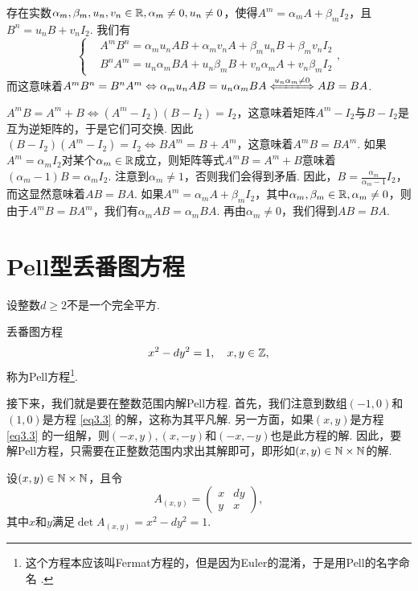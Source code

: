 \begin{solution}
  存在实数$\alpha_m,\beta_m,u_n,v_n\in\mathbb R,\alpha_m\ne0,u_n\ne0$，使得$A^m=\alpha_mA+\beta_mI_2$，且$B^n=u_nB+v_nI_2$. 我们有
  \[
    \left\{
      \begin{aligned}
        & A^mB^n = \alpha_mu_nAB + \alpha_mv_nA + \beta_mu_n B + \beta_mv_nI_2 \\
        & B^nA^m = u_n\alpha_mBA + u_n\beta_mB + v_n\alpha_mA + v_n\beta_mI_2
      \end{aligned}
    \right.,
  \]
  而这意味着$A^mB^n=B^nA^m\Leftrightarrow \alpha_mu_nAB=u_n\alpha_mBA\xLongleftrightarrow{u_n
  \alpha_m\ne0}AB=BA$.
\end{solution}

\begin{solution}
  $A^mB=A^m+B\Leftrightarrow (A^m-I_2)(B-I_2)=I_2$，这意味着矩阵$A^m-I_2$与$B-I_2$是互为逆矩阵的，于是它们可交换. 因此$(B-I_2)(A^m-I_2)=I_2\Leftrightarrow BA^m=B+A^m$，这意味着$A^mB=BA^m$. 如果$A^m=\alpha_mI_2$对某个$\alpha_m\in\mathbb R$成立，则矩阵等式$A^mB=A^m+B$意味着$(\alpha_m-1)B=\alpha_mI_2$. 注意到$\alpha_m\ne1$，否则我们会得到矛盾. 因此，$B=\frac{\alpha_m}{\alpha_m-1}I_2$，而这显然意味着$AB=BA$. 如果$A^m=\alpha_mA+\beta_mI_2$，其中$\alpha_m,\beta_m\in\mathbb R,\alpha_m\ne0$，则由于$A^mB=BA^m$，我们有$\alpha_mAB=\alpha_mBA$. 再由$\alpha_m\ne0$，我们得到$AB=BA$.
\end{solution}

\section{Pell型丢番图方程}

设整数$d\ge2$不是一个完全平方.
\begin{definition}
  丢番图方程
  \begin{equation}\label{eq3.3}
    x^2 - dy^2 = 1,\quad x,y\in\mathbb Z,
  \end{equation}
  称为{\kaishu Pell方程}\footnote{这个方程本应该叫Fermat方程的，但是因为Euler的混淆，于是用Pell的名字命名 \cite[p.341]{15}.}.
\end{definition}

接下来，我们就是要在整数范围内解Pell方程. 首先，我们注意到数组$(-1,0)$和$(1,0)$是方程 \eqref{eq3.3} 的解，这称为其{\kaishu 平凡解}. 另一方面，如果$(x,y)$是方程 \eqref{eq3.3} 的一组解，则$(-x,y),(x,-y)$和$(-x,-y)$也是此方程的解. 因此，要解Pell方程，只需要在正整数范围内求出其解即可，即形如$(x,y)\in\mathbb N\times\mathbb N$的解.

设$(x,y)\in\mathbb N\times\mathbb N$，且令
\[
  A_{(x,y)} = \begin{pmatrix}
    x & dy \\
    y & x
  \end{pmatrix},
\]
其中$x$和$y$满足$\det A_{(x,y)}=x^2-dy^2=1$.

